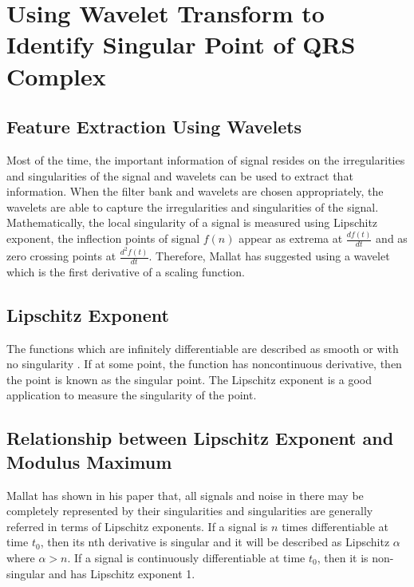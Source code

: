 \section{Using Wavelet Transform to Identify Singular Point of QRS Complex}

\subsection{Feature Extraction Using Wavelets}
Most of the time, the important information of signal resides on the irregularities and singularities of the signal and wavelets can be used to extract that information. When the filter bank and wavelets are chosen appropriately, the wavelets are able to capture the irregularities and singularities of the signal. Mathematically, the local singularity of a signal is measured using Lipschitz exponent, the inflection points of signal $f(n)$ appear as extrema at $\frac{df(t)}{dt}$ and as zero crossing points at $\frac{d^2f(t)}{dt}$. Therefore, Mallat has suggested using a wavelet which is the first derivative of a scaling function.

\subsection{Lipschitz Exponent}
The functions which are infinitely differentiable are described as smooth or with no singularity \cite{xing2013unifying}. If at some point, the function has noncontinuous derivative, then the point is known as the singular point. The Lipschitz exponent is a good application to measure the singularity of the point.

\subsection{Relationship between Lipschitz Exponent and Modulus Maximum}
Mallat has shown in his paper \cite{119727} that, all signals and noise in there may be completely represented by their singularities and singularities are generally referred in terms of Lipschitz exponents. If a signal is $n$ times differentiable at time $t_0$, then its nth derivative is singular and it will be described as Lipschitz $\alpha$ where $\alpha > n$. If a signal is continuously differentiable at time $t_0$, then it is non-singular and has Lipschitz exponent 1.

